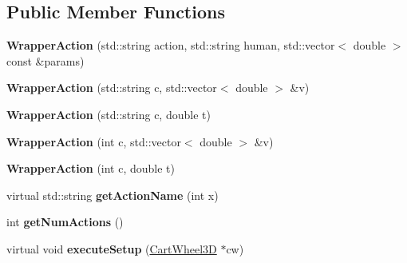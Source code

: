 \subsection*{Public Member Functions}
\begin{DoxyCompactItemize}
\item 
\hypertarget{classCartWheel_1_1WrapperAction_a8c587ee139e6b959e52e5fba28d43491}{
{\bfseries WrapperAction} (std::string action, std::string human, std::vector$<$ double $>$ const \&params)}
\label{classCartWheel_1_1WrapperAction_a8c587ee139e6b959e52e5fba28d43491}

\item 
\hypertarget{classCartWheel_1_1WrapperAction_a00dd32af58cb90ee6139f611367d7351}{
{\bfseries WrapperAction} (std::string c, std::vector$<$ double $>$ \&v)}
\label{classCartWheel_1_1WrapperAction_a00dd32af58cb90ee6139f611367d7351}

\item 
\hypertarget{classCartWheel_1_1WrapperAction_ab6d44db9868788646c0ac7f856ef951b}{
{\bfseries WrapperAction} (std::string c, double t)}
\label{classCartWheel_1_1WrapperAction_ab6d44db9868788646c0ac7f856ef951b}

\item 
\hypertarget{classCartWheel_1_1WrapperAction_a449ce72550c6c2e7a6de6c2d5426c452}{
{\bfseries WrapperAction} (int c, std::vector$<$ double $>$ \&v)}
\label{classCartWheel_1_1WrapperAction_a449ce72550c6c2e7a6de6c2d5426c452}

\item 
\hypertarget{classCartWheel_1_1WrapperAction_a1130a594aafd3d38c7ac94e148064385}{
{\bfseries WrapperAction} (int c, double t)}
\label{classCartWheel_1_1WrapperAction_a1130a594aafd3d38c7ac94e148064385}

\item 
\hypertarget{classCartWheel_1_1WrapperAction_a41379d186da91772510699e4f6a00746}{
virtual std::string {\bfseries getActionName} (int x)}
\label{classCartWheel_1_1WrapperAction_a41379d186da91772510699e4f6a00746}

\item 
\hypertarget{classCartWheel_1_1WrapperAction_a4a311b57bca9e3ff05e1770b7a1cd0de}{
int {\bfseries getNumActions} ()}
\label{classCartWheel_1_1WrapperAction_a4a311b57bca9e3ff05e1770b7a1cd0de}

\item 
\hypertarget{classCartWheel_1_1WrapperAction_a70c4ba7e02402461f7bf689373f27e80}{
virtual void {\bfseries executeSetup} (\hyperlink{classCartWheel_1_1CartWheel3D}{CartWheel3D} $\ast$cw)}
\label{classCartWheel_1_1WrapperAction_a70c4ba7e02402461f7bf689373f27e80}


\end{DoxyCompactItemize}
